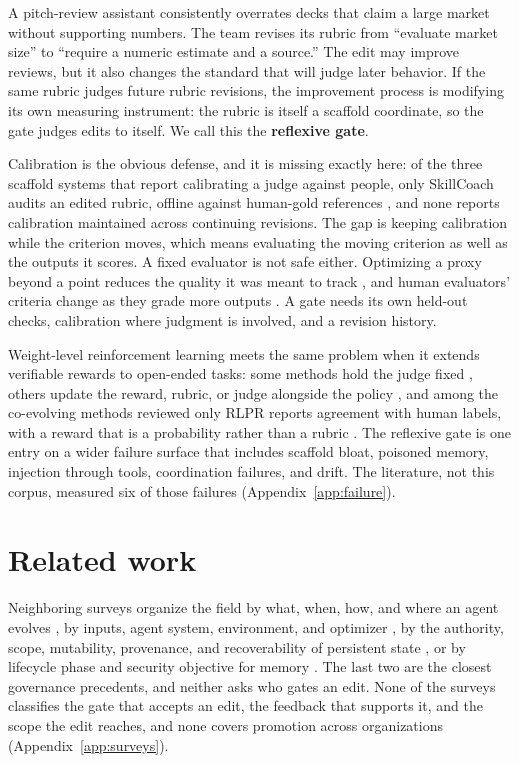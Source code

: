 A pitch-review assistant consistently overrates decks that claim a large market without supporting numbers. The team revises its rubric from ``evaluate market size'' to ``require a numeric estimate and a source.'' The edit may improve reviews, but it also changes the standard that will judge later behavior. If the same rubric judges future rubric revisions, the improvement process is modifying its own measuring instrument: the rubric is itself a scaffold coordinate, so the gate judges edits to itself. We call this the \textbf{reflexive gate}.

Calibration is the obvious defense, and it is missing exactly here: of the three scaffold systems that report calibrating a judge against people, only SkillCoach audits an edited rubric, offline against human-gold references \citep{zhu2026skillcoach}, and none reports calibration maintained across continuing revisions. The gap is keeping calibration while the criterion moves, which means evaluating the moving criterion as well as the outputs it scores. A fixed evaluator is not safe either. Optimizing a proxy beyond a point reduces the quality it was meant to track \citep{gao2023overoptimization}, and human evaluators' criteria change as they grade more outputs \citep{shankar2024validators}. A gate needs its own held-out checks, calibration where judgment is involved, and a revision history.

Weight-level reinforcement learning meets the same problem when it extends verifiable rewards to open-ended tasks: some methods hold the judge fixed \citep{gunjal2025rubrics}, others update the reward, rubric, or judge alongside the policy \citep{xu2026rubricarm, ding2026evorubrics}, and among the co-evolving methods reviewed only RLPR reports agreement with human labels, with a reward that is a probability rather than a rubric \citep{yu2025rlpr}. The reflexive gate is one entry on a wider failure surface that includes scaffold bloat, poisoned memory, injection through tools, coordination failures, and drift. The literature, not this corpus, measured six of those failures (Appendix~\ref{app:failure}).

\section{Related work}\label{sec:related}

Neighboring surveys organize the field by what, when, how, and where an agent evolves \citep{gao2026selfevolving}, by inputs, agent system, environment, and optimizer \citep{fang2025comprehensive}, by the authority, scope, mutability, provenance, and recoverability of persistent state \citep{ding2026alwayson}, or by lifecycle phase and security objective for memory \citep{lin2026memorysecurity}. The last two are the closest governance precedents, and neither asks who gates an edit. None of the surveys classifies the gate that accepts an edit, the feedback that supports it, and the scope the edit reaches, and none covers promotion across organizations (Appendix~\ref{app:surveys}).

